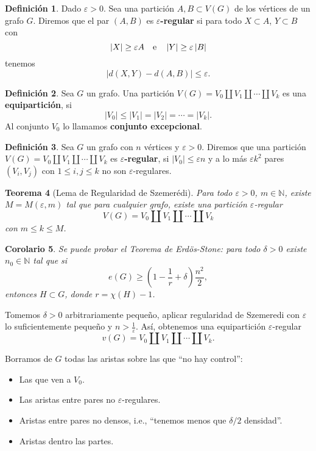 \documentclass[12pt]{report}
\theoremstyle{plain}
\newtheorem{theorem}{Teorema}[section]
\newtheorem{corollary}[theorem]{Corolario}
\theoremstyle{definition}
\newtheorem{definition}[theorem]{Definición}
\newcommand{\naturals}{\mathbb{N}}
\newcommand{\abs}[1]{\left \vert #1 \right \vert}
\begin{document}
\begin{definition}
Dado $\varepsilon > 0$. Sea una partición $A,B \subset V(G)$ de los vértices de un grafo $G$. Diremos que el par $(A,B)$ es \textbf{$\varepsilon$-regular} si para todo $X  \subset A$, $Y \subset B$ con
\[
    \abs X \geq \varepsilon A \quad \text e \quad \abs{Y} \geq \varepsilon \abs B
\]
tenemos
\[
    \abs{d (X,Y) - d(A,B)} \leq \varepsilon.
\]
\end{definition}

\begin{definition}
Sea $G$ un grafo. Una partición $V(G ) = V_0 \coprod V_1 \coprod \cdots \coprod V_k$ es una \textbf{equipartición}, si
\[
    \abs {V_0} \leq \abs{V_1} = \abs{V_2} = \cdots = \abs{V_k}.
\]
Al conjunto $V_0$ lo llamamos \textbf{conjunto excepcional}.
\end{definition}

\begin{definition}
Sea $G$ un grafo con $n$ vértices y $\varepsilon > 0$. Diremos que una partición $V(G) = V_0 \coprod V_1 \coprod \cdots \coprod V_k$ es \textbf{$\varepsilon$-regular}, si $\abs{V_0} \leq \varepsilon n$ y a lo más $\varepsilon k^2$ pares $(V_i,V_j)$ con $1 \leq i , j \leq k$ no son $\varepsilon$-regulares.
\end{definition}

\begin{theorem}[Lema de Regularidad de Szemerédi]\label{theorem:lema de regularidad de szemeredi}
Para todo $\varepsilon > 0$, $m \in \naturals$, existe $M = M (\varepsilon, m)$ tal que para cualquier grafo, existe una partición $\varepsilon$-regular
\[
    V(G) = V_0 \coprod V_1 \coprod \cdots \coprod V_k
\]
con $m \leq k \leq M$.
\end{theorem}

\begin{corollary}
Se puede probar el Teorema de Erdös-Stone: para todo $\delta >0$ existe $n_0 \in \naturals$ tal que si
\[
    e(G) \geq \left ( 1 - \frac 1 r + \delta \right ) \frac{n^2}{2},
\]
entonces $H \subset G$, donde $r = \chi (H) - 1$.
\end{corollary}

Tomemos $\delta > 0$ arbitrariamente pequeño, aplicar regularidad de Szemeredi con $\varepsilon $ lo suficientemente pequeño y $n > \frac 1 \varepsilon$. Así, obtenemos una equipartición $\varepsilon$-regular
\[
    v(G) = V_0 \coprod V_1 \coprod \cdots \coprod V_k.
\]

Borramos de $G$ todas las aristas sobre las que ``no hay control'':
\begin{itemize}
\item Las que ven a $V_0$.
\item Las aristas entre pares no $\varepsilon$-regulares.
\item Aristas entre pares no densos, i.e., ``tenemos menos que $\delta / 2$ densidad''.
\item Aristas dentro las partes.
\end{itemize}
\end{document}
